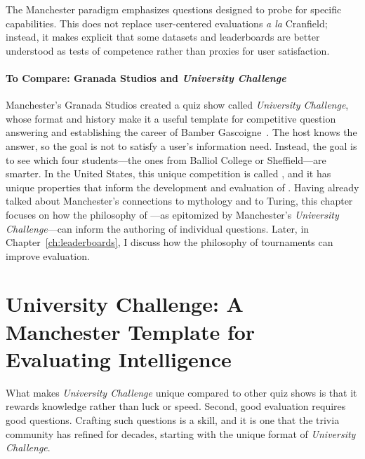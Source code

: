 The Manchester paradigm emphasizes questions designed to probe for
specific capabilities.
%
This does not replace user-centered evaluations \textit{a la}
Cranfield; instead, it makes explicit that some datasets and
leaderboards are better understood as tests of competence rather than
proxies for user satisfaction.

\paragraph{To Compare: Granada Studios and \textit{University Challenge}}
Manchester's Granada Studios created a quiz show called
\textit{University Challenge}, whose format and history make it a useful
template for competitive question answering and establishing the career of
Bamber Gascoigne~\citep{taylor_mcnulty_meek}.
%
The host knows the answer, so the goal is not to satisfy a
user's information need.
%
Instead, the goal is to see which four students---the ones from Balliol
College or Sheffield---are smarter.
%
In the United States, this unique competition is called \quizbowl{},
and it has unique properties that inform the development and
evaluation of .
%
Having already talked about Manchester's connections to mythology and
to Turing, this chapter focuses on how the philosophy of
\quizbowl{}---as epitomized by Manchester's \textit{University
Challenge}---can inform the authoring of individual questions.
%
Later, in Chapter~\ref{ch:leaderboards}, I discuss how the philosophy
of \quizbowl{} tournaments can improve  evaluation.

\section{University Challenge: A Manchester Template for Evaluating Intelligence}
\label{sec:manchester:tournaments}

What makes \textit{University Challenge} unique compared to other quiz
shows is that it rewards knowledge rather than luck or speed.
%
Second, good evaluation requires good questions. Crafting such
questions is a skill, and it is one that the trivia community has
refined for decades, starting with the unique format of
\textit{University Challenge}.

